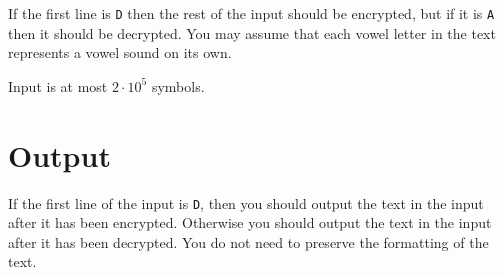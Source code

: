 If the first line is \texttt{D} then the rest of the input should be encrypted, but if it is \texttt{A} then it should be decrypted.
You may assume that each vowel letter in the text represents a vowel sound on its own.

Input is at most $2 \cdot 10^5$ symbols.

\section*{Output}
If the first line of the input is \texttt{D}, then you should output the text in the input after it has been encrypted.
Otherwise you should output the text in the input after it has been decrypted.
You do not need to preserve the formatting of the text.
